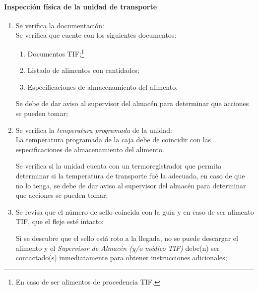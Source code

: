 \paragraph{Inspección física de la unidad de transporte}\label{sec:InspeccionTransporte}
\begin{enumerate}
    \item Se verifica la documentación:\\
    Se verifica que cuente con los siguientes documentos:
        \begin{enumerate}
            \item Documentos TIF;\footnote{En caso de ser alimentos de procedencia TIF.}
            \item Listado de alimentos con cantidades;
            \item Especificaciones de almacenamiento del alimento.
        \end{enumerate}

    \begin{itemize}
        \nocumple Se debe de dar aviso al supervisor del almacén para determinar que acciones se pueden tomar;
    \end{itemize}
    
    \item Se verifica la \emph{temperatura programada} de la unidad:\\
    La temperatura programada de la caja debe de coincidir con las especificaciones de almacenamiento del alimento.
    
          \begin{itemize}
            \nocumple Se verifica si la unidad cuenta con un termoregistrador que permita determinar si la temperatura de transporte fué la adecuada, en caso de que no lo tenga, se debe de dar aviso al supervisor del almacén para determinar que acciones se pueden tomar;
          \end{itemize}

    \item Se revisa que el número de sello coincida con la guía y en caso de ser alimento TIF, que el fleje esté intacto:
    \begin{itemize}
        \nocumple Si se descubre que el sello está roto a la llegada, no se puede descargar el alimento y el \emph{Supervisor de Almacén (y/o médico TIF)} debe(n) ser contactado(s) inmediatamente para obtener instrucciones adicionales;
    \end{itemize}
        

\end{enumerate}
